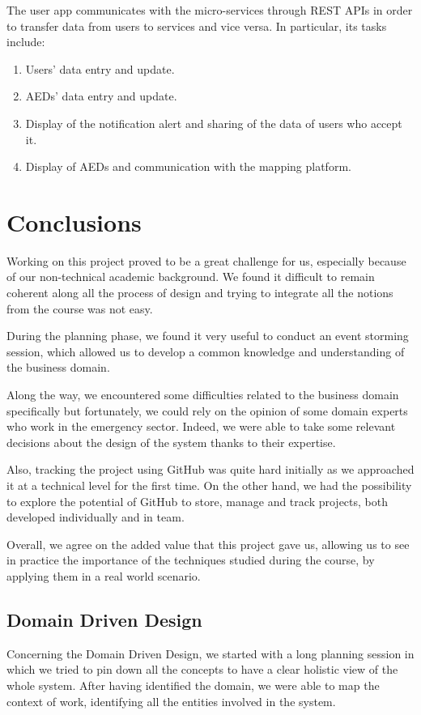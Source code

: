 \documentclass[11pt,a4paper]{article}
\begin{document}
The user app communicates with the micro-services through REST APIs in order to transfer data from users to services and vice versa.
%
In particular, its tasks include:

\begin{enumerate}
    \item Users' data entry and update.
    \item AEDs' data entry and update.
    \item Display of the notification alert and sharing of the data of users who accept it.
    \item Display of AEDs and communication with the mapping platform.
\end{enumerate}

\section{Conclusions}
Working on this project proved to be a great challenge for us, especially because of our non-technical academic background.
%
We found it difficult to remain coherent along all the process of design and trying to integrate all the notions from the course was not easy.

During the planning phase, we found it very useful to conduct an event storming session, which allowed us to develop a common knowledge and understanding of the business domain.

Along the way, we encountered some difficulties related to the business domain specifically but fortunately, we could rely on the opinion of some domain experts who work in the emergency sector.
%
Indeed, we were able to take some relevant decisions about the design of the system thanks to their expertise.

Also, tracking the project using GitHub was quite hard initially as we approached it at a technical level for the first time.
%
On the other hand, we had the possibility to explore the potential of GitHub to store, manage and track projects, both developed individually and in team.

Overall, we agree on the added value that this project gave us, allowing us to see in practice the importance of the techniques studied during the course, by applying them in a real world scenario.

\subsection{Domain Driven Design}
Concerning the Domain Driven Design, we started with a long planning session in which we tried to pin down all the concepts to have a clear holistic view of the whole system.
%
After having identified the domain, we were able to map the context of work, identifying all the entities involved in the system.
\end{document}
